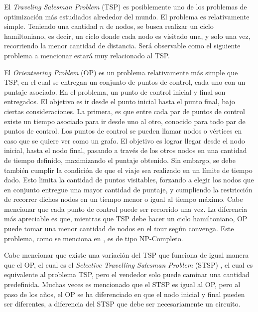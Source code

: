 \documentclass[letter, 10pt]{article}
\begin{document}
El \textit{Traveling Salesman Problem} (TSP) \cite{ProblemaTSP} es posiblemente uno de los problemas de optimización más estudiados alrededor del mundo. El problema es relativamente simple. Teniendo una cantidad $n$ de nodos, se busca realizar un ciclo hamiltoniano, es decir, un ciclo donde cada nodo es visitado una, y solo una vez, recorriendo la menor cantidad de distancia. Será observable como el siguiente problema a mencionar estará muy relacionado al TSP.

 El \textit{Orienteering Problem} (OP) \cite{ProblemaOPNPCompHeuristic} es un problema relativamente más simple que TSP, en el cual se entregan un conjunto de  puntos de control, cada uno con un puntaje asociado. En el problema, un punto de control inicial y final son entregados. El objetivo es ir desde el punto inicial hasta el punto final, bajo ciertas consideraciones. La primera, es que entre cada par de puntos de control existe un tiempo asociado para ir desde uno al otro, conocido para todo par de puntos de control. Los puntos de control se pueden llamar nodos o vértices en caso que se quiere ver como un grafo. El objetivo es lograr llegar desde el nodo inicial, hasta el nodo final, pasando a través de los otros nodos en una cantidad de tiempo definido, maximizando el puntaje obtenido. Sin embargo, se debe también cumplir la condición de que el viaje sea realizado en un límite de tiempo dado. Esto limita la cantidad de puntos visitables, forzando a elegir los nodos que en conjunto entregue una mayor cantidad de puntaje, y cumpliendo la restricción de recorrer dichos nodos en un tiempo menor o igual al tiempo máximo. Cabe mencionar que cada punto de control puede ser recorrido una vez. La diferencia más apreciable es que, mientras que TSP debe hacer un ciclo hamiltoniano, OP puede tomar una menor cantidad de nodos en el tour según convenga. Este problema, como se menciona en \cite{ProblemaOPNPCompHeuristic}, es de tipo NP-Completo.
 
 Cabe mencionar que existe una variación del TSP que funciona de igual manera que el OP, el cual es el \textit{Selective Travelling Salesman Problem} (STSP) \cite{ProblemaSTSP}, el cual es equivalente al problema TSP, pero el vendedor solo puede caminar una cantidad predefinida. Muchas veces es mencionado que el STSP es igual al OP, pero al paso de los años, el OP se ha diferenciado en que el nodo inicial y final pueden ser diferentes, a diferencia del STSP que debe ser necesariamente un circuito.
 
\end{document}
